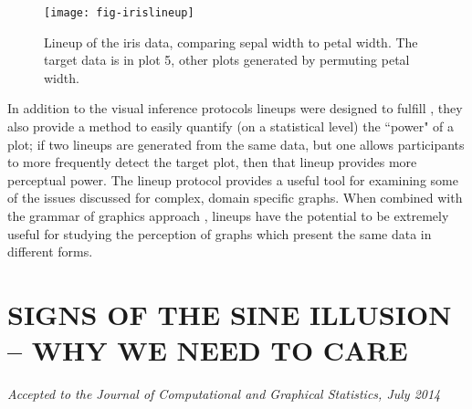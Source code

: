 \documentclass[11pt]{isuthesis}\usepackage[]{graphicx}\usepackage[]{color}
\begin{document}
\begin{figure}[htbp]\centering
\texttt{[image: fig-irislineup]}
\caption[Lineup for testing statistical graphics]{Lineup of the iris data, comparing sepal width to petal width. The target data is in plot 5, other plots generated by permuting petal width.}\label{fig:lineupexample}
\end{figure}
In addition to the visual inference protocols lineups were designed to fulfill \citep{buja2009statistical}, they also provide a method to easily quantify (on a statistical level) the ``power" of a plot; if two lineups are generated from the same data, but one allows participants to more frequently detect the target plot, then that lineup provides more perceptual power. The lineup protocol provides a useful tool for examining some of the issues discussed for complex, domain specific graphs. When combined with the grammar of graphics approach \citep{wickham2010graphical}, lineups have the potential to be extremely useful for studying the perception of graphs which present the same data in different forms.


\graphicspath{{Figure/sineIllusion/}{Images/sineIllusion/}}
\renewcommand{\floatpagefraction}{.99}

\newcommand{\range}[1]{{\text{range}\left(#1\right)}}
\newcommand{\s}[2]{{_{#1}s^{ #2}}}
\newcommand{\atan}[1]{\text{atan}\left({#1}\right)}
\newcommand{\xR}{\mathbb{R}}








\chapter{SIGNS OF THE SINE ILLUSION -- WHY WE NEED TO CARE}\label{SineIllusionChapter}\label{sineillusion}
\noindent\hfil\textit{Accepted to the Journal of Computational and Graphical Statistics, July 2014}\hfil
\end{document}
